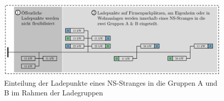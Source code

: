 \begin{figure}[H]
    \centering
    \includegraphics[width=\textwidth]{Bilder/grouped_charging_vis_cropped}
    \caption{Einteilung der Ladepunkte eines NS-Stranges in die Gruppen A und B im Rahmen der Ladegruppen}\label{fig:group_vis}
\end{figure}